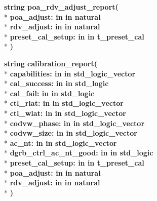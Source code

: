 \begin{DoxyCompactItemize}
{\bfseries {\bfseries \textcolor{comment}{string}\textcolor{vhdlchar}{ }}} {\bf poa\+\_\+rdv\+\_\+adjust\+\_\+report}{\bfseries  ( }\\*
{\bfseries \textcolor{vhdlchar}{poa\+\_\+adjust\+: }\textcolor{stringliteral}{in }\textcolor{vhdlchar}{in natural}}\\*
{\bfseries \textcolor{vhdlchar}{rdv\+\_\+adjust\+: }\textcolor{stringliteral}{in }\textcolor{vhdlchar}{in natural}}\\*
{\bfseries \textcolor{vhdlchar}{preset\+\_\+cal\+\_\+setup\+: }\textcolor{stringliteral}{in }\textcolor{vhdlchar}{in t\+\_\+preset\+\_\+cal}}\\*
{\bfseries  )} 
\item 
{\bfseries {\bfseries \textcolor{comment}{string}\textcolor{vhdlchar}{ }}} {\bf calibration\+\_\+report}{\bfseries  ( }\\*
{\bfseries \textcolor{vhdlchar}{capabilities\+: }\textcolor{stringliteral}{in }\textcolor{vhdlchar}{in std\+\_\+logic\+\_\+vector}}\\*
{\bfseries \textcolor{vhdlchar}{cal\+\_\+success\+: }\textcolor{stringliteral}{in }\textcolor{vhdlchar}{in std\+\_\+logic}}\\*
{\bfseries \textcolor{vhdlchar}{cal\+\_\+fail\+: }\textcolor{stringliteral}{in }\textcolor{vhdlchar}{in std\+\_\+logic}}\\*
{\bfseries \textcolor{vhdlchar}{ctl\+\_\+rlat\+: }\textcolor{stringliteral}{in }\textcolor{vhdlchar}{in std\+\_\+logic\+\_\+vector}}\\*
{\bfseries \textcolor{vhdlchar}{ctl\+\_\+wlat\+: }\textcolor{stringliteral}{in }\textcolor{vhdlchar}{in std\+\_\+logic\+\_\+vector}}\\*
{\bfseries \textcolor{vhdlchar}{codvw\+\_\+phase\+: }\textcolor{stringliteral}{in }\textcolor{vhdlchar}{in std\+\_\+logic\+\_\+vector}}\\*
{\bfseries \textcolor{vhdlchar}{codvw\+\_\+size\+: }\textcolor{stringliteral}{in }\textcolor{vhdlchar}{in std\+\_\+logic\+\_\+vector}}\\*
{\bfseries \textcolor{vhdlchar}{ac\+\_\+nt\+: }\textcolor{stringliteral}{in }\textcolor{vhdlchar}{in std\+\_\+logic\+\_\+vector}}\\*
{\bfseries \textcolor{vhdlchar}{dgrb\+\_\+ctrl\+\_\+ac\+\_\+nt\+\_\+good\+: }\textcolor{stringliteral}{in }\textcolor{vhdlchar}{in std\+\_\+logic}}\\*
{\bfseries \textcolor{vhdlchar}{preset\+\_\+cal\+\_\+setup\+: }\textcolor{stringliteral}{in }\textcolor{vhdlchar}{in t\+\_\+preset\+\_\+cal}}\\*
{\bfseries \textcolor{vhdlchar}{poa\+\_\+adjust\+: }\textcolor{stringliteral}{in }\textcolor{vhdlchar}{in natural}}\\*
{\bfseries \textcolor{vhdlchar}{rdv\+\_\+adjust\+: }\textcolor{stringliteral}{in }\textcolor{vhdlchar}{in natural}}\\*
{\bfseries  )} 
\end{DoxyCompactItemize}
